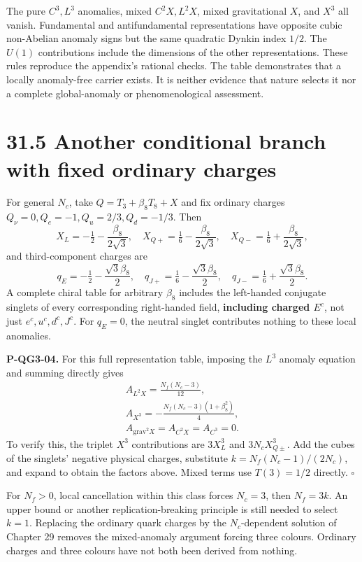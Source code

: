 \documentclass[
  11pt,
  oneside]{book}
\begin{document}
The pure \(C^3,L^3\) anomalies, mixed \(C^2X,L^2X\), mixed gravitational
\(X\), and \(X^3\) all vanish. Fundamental and antifundamental
representations have opposite cubic non-Abelian anomaly signs but the
same quadratic Dynkin index \(1/2\). The \(U(1)\) contributions include
the dimensions of the other representations. These rules reproduce the
appendix's rational checks. The table demonstrates that a locally
anomaly-free carrier exists. It is neither evidence that nature selects
it nor a complete global-anomaly or phenomenological assessment.

\section{31.5 Another conditional branch with fixed ordinary charges}

For general \(N_c\), take \(Q=T_3+\beta_8T_8+X\) and fix ordinary
charges \(Q_\nu=0,Q_e=-1,Q_u=2/3,Q_d=-1/3\). Then \[
X_L=-\tfrac12-\frac{\beta_8}{2\sqrt3},\quad
X_{Q+}=\tfrac16-\frac{\beta_8}{2\sqrt3},\quad
X_{Q-}=\tfrac16+\frac{\beta_8}{2\sqrt3},
\] and third-component charges are \[
q_E=-\tfrac12-\frac{\sqrt3\beta_8}{2},\quad
q_{J+}=\tfrac16-\frac{\sqrt3\beta_8}{2},\quad
q_{J-}=\tfrac16+\frac{\sqrt3\beta_8}{2}.
\] A complete chiral table for arbitrary \(\beta_8\) includes the
left-handed conjugate singlets of every corresponding right-handed
field, \textbf{including charged \(E^c\)}, not just \(e^c,u^c,d^c,J^c\).
For \(q_E=0\), the neutral singlet contributes nothing to these local
anomalies.

\label{p-qg3-04}{}

\textbf{P-QG3-04.} For this full representation table, imposing the
\(L^3\) anomaly equation and summing directly gives \[
\begin{gathered}
A_{L^2X}=\frac{N_f(N_c-3)}{12},\\
A_{X^3}=-\frac{N_f(N_c-3)(1+\beta_8^2)}4,
\\ A_{\mathrm{grav}^2X}=A_{C^2X}=A_{C^3}=0.
\end{gathered}
\] To verify this, the triplet \(X^3\) contributions are \(3X_L^3\) and
\(3N_cX_{Q\pm}^3\). Add the cubes of the singlets' negative physical
charges, substitute \(k=N_f(N_c-1)/(2N_c)\), and expand to obtain the
factors above. Mixed terms use \(T(3)=1/2\) directly. \(\square\)

For \(N_f>0\), local cancellation within this class forces \(N_c=3\),
then \(N_f=3k\). An upper bound or another replication-breaking
principle is still needed to select \(k=1\). Replacing the ordinary
quark charges by the \(N_c\)-dependent solution of Chapter 29 removes
the mixed-anomaly argument forcing three colours. Ordinary charges and
three colours have not both been derived from nothing.
\end{document}
